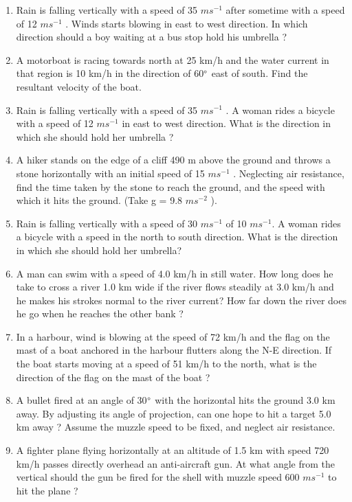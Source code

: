 \renewcommand{\theequation}{\theenumi}
\begin{enumerate}[label=\arabic*.,ref=\thesubsection.\theenumi]
%
\item Rain is falling vertically with a speed of 35 $m s^{-1}$
after sometime with a speed of 12 $m s^{-1}$
. Winds starts blowing in
east to west direction. In which direction should a boy waiting at a bus stop hold his umbrella ?
%
\item A motorboat is racing towards north at 25 km/h and the water current in that region is 10 km/h in the direction of 60$\degree$ east of south. Find the resultant velocity of the boat.
\item Rain is falling vertically with a speed of 35 $m s^{-1}$
. A woman rides a bicycle with a speed of 12 $ms^{-1}$ in east to west
direction. What is the direction in which she should hold her umbrella ?
\item  A hiker stands on the edge of a cliff 490 m above the ground and throws a stone horizontally with an initial speed of 15 $m s^{-1}$
. Neglecting air resistance,
find the time taken by the stone to reach the ground, and the speed with which it hits the ground. (Take g = 9.8 $m s^{-2}$
).
\item Rain is falling vertically with a speed of 30 $m s^{-1}$ of 10 $m s^{-1}$. A woman rides a bicycle with a speed in the north to south direction. What is the direction in which she should
hold her umbrella?
\item A man can swim with a speed of 4.0 km/h in still water. How long does he take to cross a river 1.0 km wide if the river flows steadily at 3.0 km/h and he makes his strokes normal to the river current? How far down the river does he go when he reaches the other bank ?
\item In a harbour, wind is blowing at the speed of 72 km/h and the flag on the mast of a boat anchored in the harbour flutters along the N-E direction. If the boat starts moving at a speed of 51 km/h to the north, what is the direction of the flag on the mast of the boat ?
\item A bullet fired at an angle of 30$\degree$ with the horizontal hits the ground 3.0 km away. By adjusting its angle of projection, can one hope to hit a target 5.0 km away ? Assume the muzzle speed to be fixed, and neglect air resistance.
\item  A fighter plane flying horizontally at an altitude of 1.5 km with speed 720 km/h passes directly overhead an anti-aircraft gun. At what angle from the vertical should the gun be fired for the shell with muzzle speed 600 $m s^{-1}$ to hit the plane ? 

\end{enumerate}
